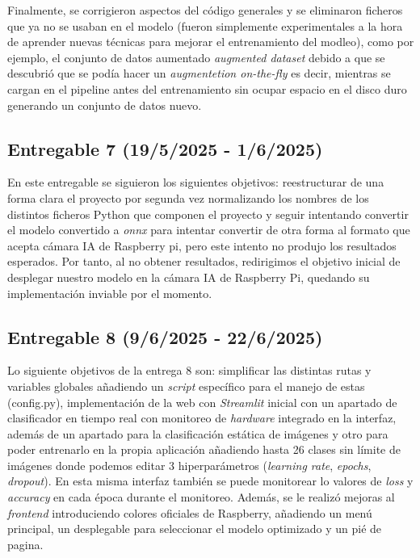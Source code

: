 Finalmente, se corrigieron aspectos del código generales y se eliminaron ficheros que ya no se usaban en el modelo (fueron simplemente experimentales a la hora de aprender nuevas técnicas para mejorar el entrenamiento del modleo), como por ejemplo, el conjunto de datos aumentado \textit{augmented dataset} debido a que se descubrió que se podía hacer un \textit{augmentetion on-the-fly} es decir, mientras se cargan en el pipeline antes del entrenamiento sin ocupar espacio en el disco duro generando un conjunto de datos nuevo. 


\subsection{Entregable 7 (19/5/2025 - 1/6/2025)}
En este entregable se siguieron los siguientes objetivos: reestructurar de una forma clara el proyecto por segunda vez normalizando los nombres de los distintos ficheros Python que componen el proyecto y seguir intentando convertir el modelo convertido a \textit{onnx} para intentar convertir de otra forma al formato que acepta cámara IA de Raspberry pi, pero este intento no produjo los resultados esperados. Por tanto, al no obtener resultados, redirigimos el objetivo inicial de desplegar nuestro modelo en la cámara IA de Raspberry Pi, quedando su implementación inviable por el momento.



\subsection{Entregable 8 (9/6/2025 - 22/6/2025)}
Lo siguiente objetivos de la entrega 8 son: simplificar las distintas rutas y variables globales añadiendo un \textit{script} específico para el manejo de estas (config.py), implementación de la web con \textit{Streamlit} inicial con un apartado de clasificador en tiempo real con monitoreo de \textit{hardware} integrado en la interfaz, además de un apartado para la clasificación estática de imágenes y otro para poder entrenarlo en la propia aplicación añadiendo hasta 26 clases sin límite de imágenes donde podemos editar 3 hiperparámetros (\textit{learning rate}, \textit{epochs}, \textit{dropout}). En esta misma interfaz también se puede monitorear lo valores de \textit{loss} y \textit{accuracy} en cada época durante el monitoreo. Además, se le realizó mejoras al \textit{frontend} introduciendo colores oficiales de Raspberry, añadiendo un menú principal, un desplegable para seleccionar el modelo optimizado y un pié de pagina.

